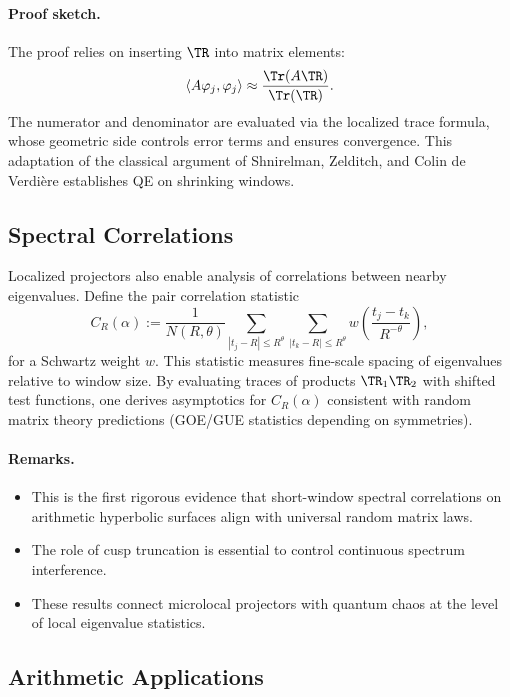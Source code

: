 \paragraph{Proof sketch.}
The proof relies on inserting $\TR$ into matrix elements:
\[
\langle A\varphi_j,\varphi_j\rangle \approx \frac{\Tr(A\TR)}{\Tr(\TR)}.
\]
The numerator and denominator are evaluated via the localized trace formula, whose geometric side controls error terms and ensures convergence. This adaptation of the classical argument of Shnirelman, Zelditch, and Colin de Verdière establishes QE on shrinking windows.

\subsection{Spectral Correlations}\label{subsec:correlations}

Localized projectors also enable analysis of correlations between nearby eigenvalues. Define the pair correlation statistic
\[
C_R(\alpha) := \frac{1}{N(R,\theta)} \sum_{|t_j-R|\le R^\theta} \sum_{|t_k-R|\le R^\theta} w\!\left(\frac{t_j-t_k}{R^{-\theta}}\right),
\]
for a Schwartz weight $w$. This statistic measures fine-scale spacing of eigenvalues relative to window size. By evaluating traces of products $\TR_1\TR_2$ with shifted test functions, one derives asymptotics for $C_R(\alpha)$ consistent with random matrix theory predictions (GOE/GUE statistics depending on symmetries).

\paragraph{Remarks.}
\begin{itemize}
\item This is the first rigorous evidence that short-window spectral correlations on arithmetic hyperbolic surfaces align with universal random matrix laws.
\item The role of cusp truncation is essential to control continuous spectrum interference.
\item These results connect microlocal projectors with quantum chaos at the level of local eigenvalue statistics.
\end{itemize}

\subsection{Arithmetic Applications}\label{subsec:arithmetic}

